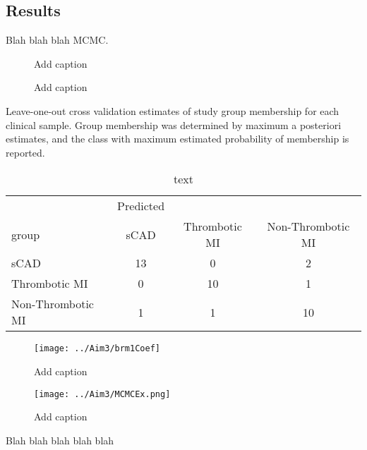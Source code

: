 \begin{DoubleSpace*}
\section{Results}
Blah blah blah MCMC.

 \begin{figure}[H]
 	\caption[Add caption]{Add caption \label{fig:ptid2010MCMC} }
 \end{figure}
 
  \begin{figure}[H]
  	\caption[Add caption]{Add caption \label{fig:ptid2010Hist} }
  \end{figure}
 
  Leave-one-out cross validation estimates of study group membership for each clinical sample. Group membership was determined by maximum a posteriori estimates, and the class with maximum estimated probability of membership is reported.
 
\begin{table}[H]
	\caption{text}
	\label{tab:modelRes}
	\centering
	\begin{tabular}{l|ccc}
		           & Predicted & & \\
		           group  &     sCAD & Thrombotic MI & Non-Thrombotic MI \\
		           \hline
		           sCAD   &     13    &     0    &     2\\
		           Thrombotic MI  &  0    &    10    &     1\\
		           Non-Thrombotic MI &   1    &     1   &     10
	\end{tabular}
\end{table}

\end{DoubleSpace*}

\newpage
{}
\recalctypearea
\begin{figure}[H]
	\texttt{[image: ../Aim3/brm1Coef]}
	\caption[Add caption]{Add caption \label{fig:brm1Coef} }
\end{figure}
\newpage
\begin{figure}[H]
	\texttt{[image: ../Aim3/MCMCEx.png]}
	\caption[Add caption]{Add caption \label{fig:brm1Coef} }
\end{figure}
\newpage
{}
\recalctypearea

Blah blah blah blah blah 